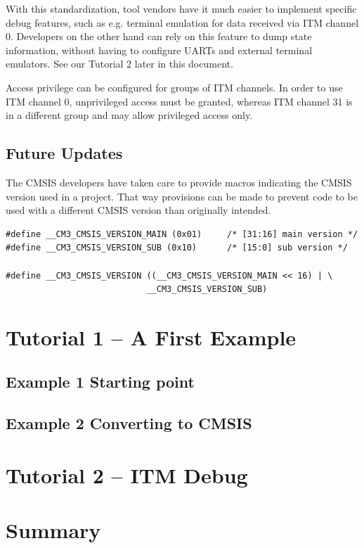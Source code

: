 With this standardization, tool vendors have it much easier to implement
specific debug features, such as e.g. terminal emulation for data received via
ITM channel 0. Developers on the other hand can rely on this feature to dump
state information, without having to configure UARTs and external terminal
emulators. See our Tutorial 2 later in this document.

Access privilege can be configured for groups of ITM channels. In order to use
ITM channel 0, unprivileged access must be granted, whereas ITM channel 31 is in
a different group and may allow privileged access only.

\subsection{Future Updates}

The CMSIS developers have taken care to provide macros indicating the CMSIS
version used in a project. That way provisions can be made to prevent code to be
used with a different CMSIS version than originally intended.

\begin{lstlisting}[style=cpp]
#define __CM3_CMSIS_VERSION_MAIN (0x01)		/* [31:16] main version */
#define __CM3_CMSIS_VERSION_SUB (0x10)		/* [15:0] sub version */

#define __CM3_CMSIS_VERSION ((__CM3_CMSIS_VERSION_MAIN << 16) | \
							__CM3_CMSIS_VERSION_SUB)
\end{lstlisting}

\section{Tutorial 1 – A First Example}
\subsection{Example 1 Starting point}
\subsection{Example 2 Converting to CMSIS}
\section{Tutorial 2 – ITM Debug}
\section{Summary}




